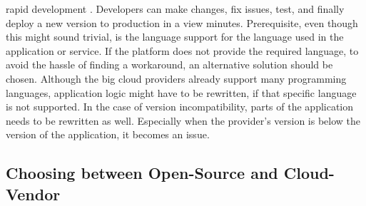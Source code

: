 \documentclass[a4paper,twoside,11pt, pagesize]{scrartcl}
\begin{document}
\begin{spacing}{1.2}
rapid development \cite{sewak2018winning} \cite{leitner2019mixed}. Developers can make changes, fix issues, test, and finally deploy a new version to production in a view minutes. Prerequisite, even though this might sound trivial, is the language support for the language used in the application or service. If the platform does not provide the required language, to avoid the hassle of finding a workaround, an alternative solution should be chosen. Although the big cloud providers already support many programming languages, application logic might have to be rewritten, if that specific language is not supported. In the case of version incompatibility, parts of the application needs to be rewritten as well. Especially when the provider's version is below the version of the application, it becomes an issue.
\subsection{Choosing between Open-Source and Cloud-Vendor}

\end{spacing}
\end{document}
